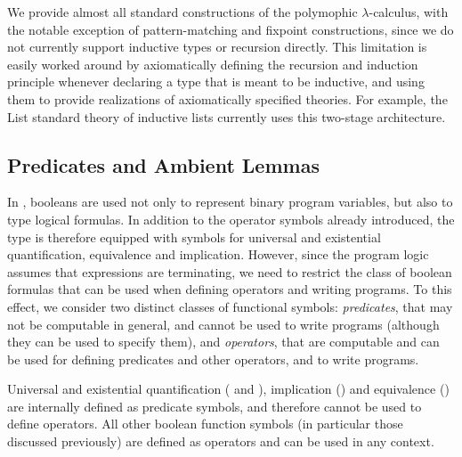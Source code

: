 We provide almost all standard constructions of the polymophic
$\lambda$-calculus, with the notable exception of pattern-matching and fixpoint
constructions, since we do not currently support inductive types or recursion
directly. This limitation is easily worked around by axiomatically defining the
recursion and induction principle whenever declaring a type that is meant to be
inductive, and using them to provide realizations of axiomatically specified
theories. For example, the \textsf{List} standard theory of inductive lists
currently uses this two-stage architecture.


\subsection{Predicates and Ambient Lemmas\label{sec:ec-specifics}}
In \EasyCrypt, booleans are used not only to represent binary program variables, but
also to type logical formulas. In addition to the operator symbols already
introduced, the  type is therefore equipped with
symbols for universal and existential quantification, equivalence and
implication. However, since the program logic assumes that expressions are
terminating, we need to restrict the class of boolean formulas that can be used
when defining operators and writing programs. To this effect, we consider two
distinct classes of functional symbols: \emph{predicates}, that may not be
computable in general, and cannot be used to write programs (although they can
be used to specify them), and \emph{operators}, that are computable and can be
used for defining predicates and other operators, and to write programs.

Universal and existential quantification ( and ),
implication (\rawec{=>}) and equivalence (\rawec{<=>}) are internally defined as
predicate symbols, and therefore cannot be used to define operators. All other
boolean function symbols (in particular those discussed previously) are defined
as operators and can be used in any context.


